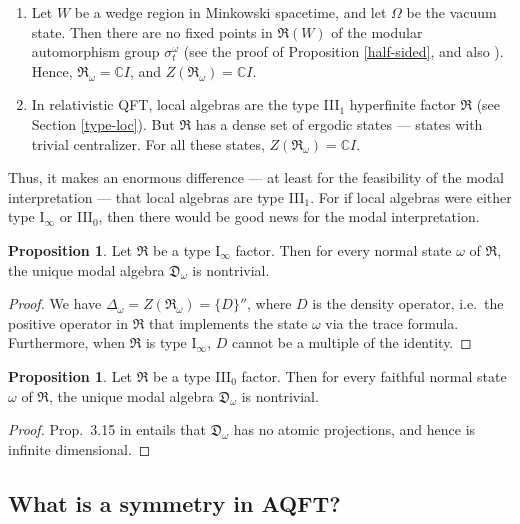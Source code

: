 \documentclass[12pt]{article}
\theoremstyle{definition}
\newtheorem{prop}[thm]{Proposition}
\theoremstyle{definition}
\theoremstyle{remark}
\def\7#1{{\mathbb #1}}
\def\al#1{{\mathfrak #1}}
\def\om{\omega} \def\Om{\Omega} \def\dd{\partial} \def\D{\Delta}
\begin{document}
\begin{enumerate}
\item Let $W$ be a wedge region in Minkowski spacetime, and let $\Om$
  be the vacuum state.  Then there are no fixed points in $\al R(W)$
  of the modular automorphism group $\sigma ^\om _t$ (see the proof of
  Proposition \ref{half-sided}, and also \cite{wulf}). Hence, $\al
  R_\om =\7C I$, and $Z (\al R_\om )=\7C I$.
\item In relativistic QFT, local algebras are the type III$_1$
  hyperfinite factor $\al R$ (see Section \ref{type-loc}).  But $\al
  R$ has a dense set of ergodic states --- states with trivial
  centralizer.  For all these states, $Z(\al R_\om)=\7C I$.
\end{enumerate}

Thus, it makes an enormous difference --- at least for the feasibility
of the modal interpretation --- that local algebras are type III$_1$.
For if local algebras were either type I$_{\infty}$ or III$_0$, then
there would be good news for the modal interpretation.

\begin{prop} Let $\al R$ be a type I$_\infty$ factor.  Then for every
  normal state $\om$ of $\al R$, the unique modal algebra $\al D_\om$
  is nontrivial.  \end{prop}

\begin{proof} We have $\D _\om = Z(\al R_\om )=\{ D\}''$, where $D$ is
  the density operator, i.e.\ the positive operator in $\al R$ that
  implements the state $\om$ via the trace formula.  Furthermore, when
  $\al R$ is type I$_\infty$, $D$ cannot be a multiple of the
  identity.
\end{proof}

\begin{prop} Let $\al R$ be a type III$_0$ factor.  Then for every
  faithful normal state $\om$ of $\al R$, the unique modal algebra
  $\al D_\om$ is nontrivial.
\end{prop}

\begin{proof} Prop.\ 3.15 in \cite[p.\ 402]{tak2} entails that $\al
  D_\om$ has no atomic projections, and hence is infinite dimensional.
\end{proof}




\subsection{What is a symmetry in AQFT?}
\end{document}
